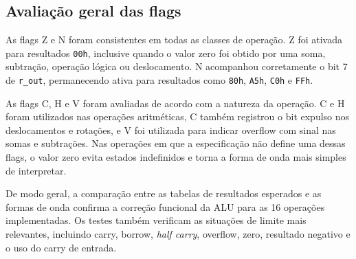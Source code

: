 \subsection{Avaliação geral das flags}

As flags Z e N foram consistentes em todas as classes de operação. Z foi
ativada para resultados \texttt{00h}, inclusive quando o valor zero foi
obtido por uma soma, subtração, operação lógica ou deslocamento. N acompanhou
corretamente o bit 7 de \texttt{r\_out}, permanecendo ativa para resultados
como \texttt{80h}, \texttt{A5h}, \texttt{C0h} e \texttt{FFh}.

As flags C, H e V foram avaliadas de acordo com a natureza da operação. C e H
foram utilizados nas operações aritméticas, C também registrou o bit expulso
nos deslocamentos e rotações, e V foi utilizada para indicar overflow com
sinal nas somas e subtrações. Nas operações em que a especificação não define
uma dessas flags, o valor zero evita estados indefinidos e torna a forma de
onda mais simples de interpretar.

De modo geral, a comparação entre as tabelas de resultados esperados e as
formas de onda confirma a correção funcional da ALU para as 16 operações
implementadas. Os testes também verificam as situações de limite mais
relevantes, incluindo carry, borrow, \textit{half carry}, overflow, zero,
resultado negativo e o uso do carry de entrada.
